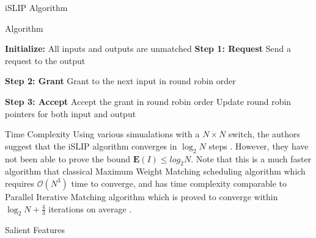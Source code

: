 \newpage
\begin{section}{iSLIP Algorithm \cite{769767}}

    \begin{subsection}{Algorithm}
        \begin{algorithm}[h!]
            \caption{iSLIP Algorithm}
            \begin{algorithmic}[1]
                \State \textbf{Initialize:} All inputs and outputs are unmatched
                \Repeat
                    \State \textbf{Step 1: Request}
                            \State Send a request to the output
                        \EndFor
                    \EndFor
                    
                    \State \textbf{Step 2: Grant}
                            \State Grant to the next input in round robin order
                        \EndIf
                    \EndFor
                    
                    \State \textbf{Step 3: Accept}
                            \State Accept the grant in round robin order
                            \State Update round robin pointers for both input and output
                        \EndIf
                    \EndFor
            \end{algorithmic}
        \end{algorithm}
    \end{subsection}

    \begin{subsection}{Time Complexity}
        Using various simualations with a $N\times N$ switch, the authors suggest that the iSLIP algorithm converges in $\log_2 N$ steps \cite{1}. However, they have not been able to prove the bound $\mathbf{E}(I) \leq log_2 N$. 
        Note that this is a much faster algorithm that classical Maximum Weight Matching scheduling algorithm which requires $\mathcal{O}(N^3)$ time to converge, and has time complexity comparable to Parallel Iterative Matching algorithm which is proved to converge within $\log_2 N + \frac{4}{3}$ iterations on average \cite{1} .
    \end{subsection}

    \begin{subsection}{Salient Features}


\end{subsection}
\end{section}
